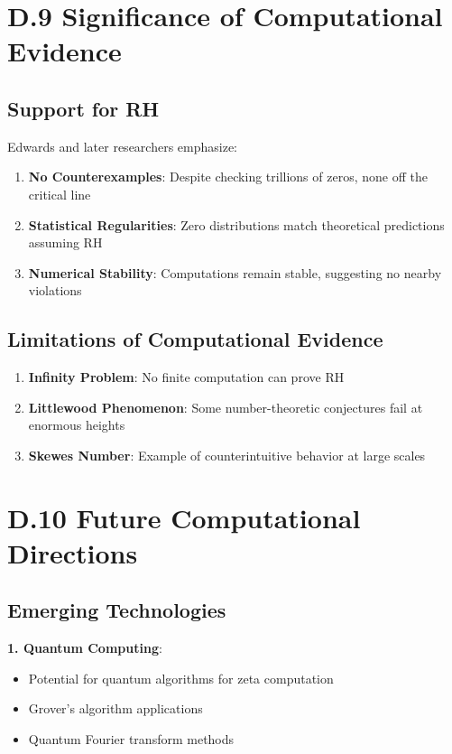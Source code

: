 \section{D.9 Significance of Computational Evidence}

\subsection{Support for RH}

Edwards \cite{edwards1974} and later researchers emphasize:

\begin{enumerate}
\item \textbf{No Counterexamples}: Despite checking trillions of zeros, none off the critical line
\item \textbf{Statistical Regularities}: Zero distributions match theoretical predictions assuming RH
\item \textbf{Numerical Stability}: Computations remain stable, suggesting no nearby violations
\end{enumerate}

\subsection{Limitations of Computational Evidence}

\begin{enumerate}
\item \textbf{Infinity Problem}: No finite computation can prove RH
\item \textbf{Littlewood Phenomenon}: Some number-theoretic conjectures fail at enormous heights
\item \textbf{Skewes Number}: Example of counterintuitive behavior at large scales
\end{enumerate}

\section{D.10 Future Computational Directions}

\subsection{Emerging Technologies}

\textbf{1. Quantum Computing}:
\begin{itemize}
\item Potential for quantum algorithms for zeta computation
\item Grover's algorithm applications
\item Quantum Fourier transform methods
\end{itemize}

